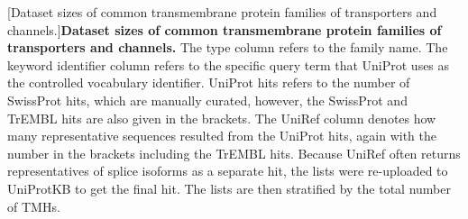 \begin{table}[htbp]

  \centering
  [Dataset sizes of common transmembrane protein families of transporters and channels.]{\textbf{Dataset sizes of common transmembrane protein families of transporters and channels.}
  The type column refers to the family name.
  The keyword identifier column refers to the specific query term that UniProt uses as the controlled vocabulary identifier.
  UniProt hits refers to the number of SwissProt hits, which are manually curated, however, the SwissProt and TrEMBL hits are also given in the brackets.
  The UniRef column denotes how many representative sequences resulted from the UniProt hits, again with the number in the brackets including the TrEMBL hits.
  Because UniRef often returns representatives of splice isoforms as a separate hit, the lists were re-uploaded to UniProtKB to get the final hit.
  The lists are then stratified by the total number of TMHs.
  }
\footnotesize
\begin{tabular}{lllllll}


\end{tabular}
\end{table}
